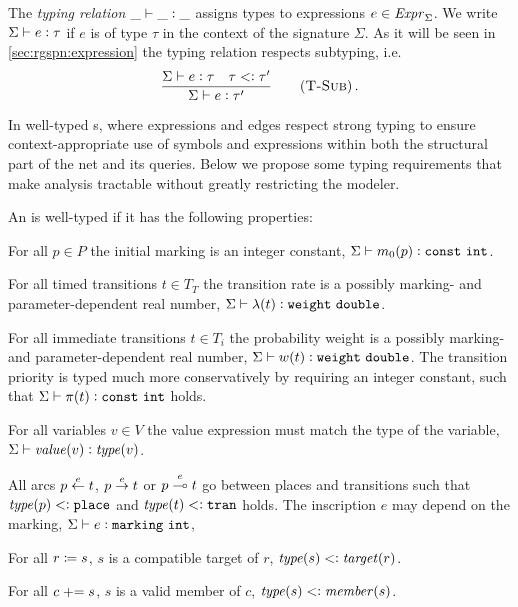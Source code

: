 The \emph{typing relation} \({\_} \vdash {\_} \mathrel{\vcentcolon} {\_}\) assigns types to expressions \(e \in \textrm{\itshape Expr\/}_\Sigma\). We write \(\Sigma \vdash e \mathrel{\vcentcolon} \tau\) if \(e\) is of type \(\tau\) in the context of the  signature \(\Sigma\). As it will be seen in \vref{sec:rgspn:expression} the typing relation respects subtyping, i.e.
\begin{equation}
  \frac{\Sigma \vdash e \oftype \tau \quad \tau \subtype \tau'}{%
    \Sigma \vdash e \oftype \tau'} \Tag{T-Sub} \,\text.
\end{equation}

In well-typed s, where expressions and edges respect strong typing to ensure context-appropriate use of symbols and expressions within both the structural part of the net and its queries. Below we propose some typing requirements that make analysis tractable without greatly restricting the modeler.

\begin{dfn}
  An  is well-typed if it has the following properties:
  \begin{compactitem}
  \item For all \(p \in P\) the initial marking is an integer constant, \(\Sigma \vdash m_0(p) \mathrel{\vcentcolon} \texttt{\upshape const}\ \texttt{\upshape int}\).
  \item For all timed transitions \(t \in T_T\) the transition rate is a possibly marking- and parameter-dependent real number, \(\Sigma \vdash \lambda(t) \mathrel{\vcentcolon} \texttt{\upshape weight}\ \texttt{\upshape double}\).
  \item For all immediate transitions \(t \in T_i\) the probability weight is a possibly marking- and parameter-dependent real number, \(\Sigma \vdash w(t) \mathrel{\vcentcolon} \texttt{\upshape weight}\ \texttt{\upshape double}\). The transition priority is typed much more conservatively by requiring an integer constant, such that \(\Sigma \vdash \pi(t) \mathrel{\vcentcolon} \texttt{\upshape const}\ \texttt{\upshape int}\) holds.
  \item For all variables \(v \in V\) the value expression must match the type of the variable, \(\Sigma \vdash \textrm{\itshape value\/}(v) \mathrel{\vcentcolon} \textrm{\itshape type\/}(v)\).
  \item All arcs \(p \overset{e}{\leftarrow} t\), \(p \overset{e}{\rightarrow} t\) or \(p \overset{e}{\multimap} t\) go between places and transitions such that \(\textrm{\itshape type\/}(p) \mathrel{<\vcentcolon} \texttt{\upshape place}\) and \(\textrm{\itshape type\/}(t) \mathrel{<\vcentcolon} \texttt{\upshape tran}\) holds. The inscription \(e\) may depend on the marking, \(\Sigma \vdash e \mathrel{\vcentcolon} \texttt{\upshape marking}\ \texttt{\upshape int}\),
  \item For all \(r \coloneq s\), \(s\) is a compatible target of \(r\), \(\textrm{\itshape type\/}(s) \mathrel{<\vcentcolon} \textrm{\itshape target\/}(r)\).
  \item For all \(c \mathrel{{+}{=}} s\), \(s\) is a valid member of \(c\), \(\textrm{\itshape type\/}(s) \mathrel{<\vcentcolon} \textrm{\itshape member\/}(s)\).
  \end{compactitem}
\end{dfn}


